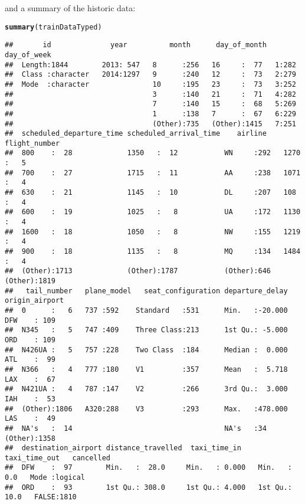 \documentclass{article}\usepackage[]{graphicx}\usepackage[]{color}
\makeatletter
\newcommand{\hlstd}[1]{\textcolor[rgb]{0.345,0.345,0.345}{#1}}%
\newcommand{\hlkwd}[1]{\textcolor[rgb]{0.737,0.353,0.396}{\textbf{#1}}}%
\newenvironment{kframe}{%
 \def\at@end@of@kframe{}%
 \ifinner\ifhmode%
  \def\at@end@of@kframe{\end{minipage}}%
  \begin{minipage}{\columnwidth}%
 \fi\fi%
 \def\FrameCommand##1{\hskip\@totalleftmargin \hskip-\fboxsep
 \colorbox{shadecolor}{##1}\hskip-\fboxsep
     \hskip-\linewidth \hskip-\@totalleftmargin \hskip\columnwidth}%
 \MakeFramed {\advance\hsize-\width
   \@totalleftmargin\z@ \linewidth\hsize
   \@setminipage}}%
 {\par\unskip\endMakeFramed%
 \at@end@of@kframe}
\newenvironment{knitrout}{}{} %
\makeatother
\begin{document}
and a summary of the historic data: 
\begin{knitrout}
\color{fgcolor}\begin{kframe}
\begin{alltt}
\hlkwd{summary}\hlstd{(trainDataTyped)}
\end{alltt}
\begin{verbatim}
##       id              year          month      day_of_month  day_of_week
##  Length:1844        2013: 547   8      :256   16     :  77   1:282      
##  Class :character   2014:1297   9      :240   12     :  73   2:279      
##  Mode  :character               10     :195   23     :  73   3:252      
##                                 3      :140   21     :  71   4:282      
##                                 7      :140   15     :  68   5:269      
##                                 1      :138   7      :  67   6:229      
##                                 (Other):735   (Other):1415   7:251      
##  scheduled_departure_time scheduled_arrival_time    airline    flight_number 
##  800    :  28             1350   :  12           WN     :292   1270   :   5  
##  700    :  27             1715   :  11           AA     :238   1071   :   4  
##  630    :  21             1145   :  10           DL     :207   108    :   4  
##  600    :  19             1025   :   8           UA     :172   1130   :   4  
##  1600   :  18             1050   :   8           NW     :155   1219   :   4  
##  900    :  18             1135   :   8           MQ     :134   1484   :   4  
##  (Other):1713             (Other):1787           (Other):646   (Other):1819  
##   tail_number   plane_model   seat_configuration departure_delay   origin_airport
##  0      :   6   737 :592    Standard   :531      Min.   :-20.000   DFW    : 109  
##  N345   :   5   747 :409    Three Class:213      1st Qu.: -5.000   ORD    : 109  
##  N426UA :   5   757 :228    Two Class  :184      Median :  0.000   ATL    :  99  
##  N366   :   4   777 :180    V1         :357      Mean   :  5.718   LAX    :  67  
##  N421UA :   4   787 :147    V2         :266      3rd Qu.:  3.000   IAH    :  53  
##  (Other):1806   A320:288    V3         :293      Max.   :478.000   LAS    :  49  
##  NA's   :  14                                    NA's   :34        (Other):1358  
##  destination_airport distance_travelled  taxi_time_in    taxi_time_out   cancelled      
##  DFW    :  97        Min.   :  28.0     Min.   : 0.000   Min.   :  0.0   Mode :logical  
##  ORD    :  93        1st Qu.: 308.0     1st Qu.: 4.000   1st Qu.: 10.0   FALSE:1810     

\end{verbatim}
\end{kframe}
\end{knitrout}
\end{document}
